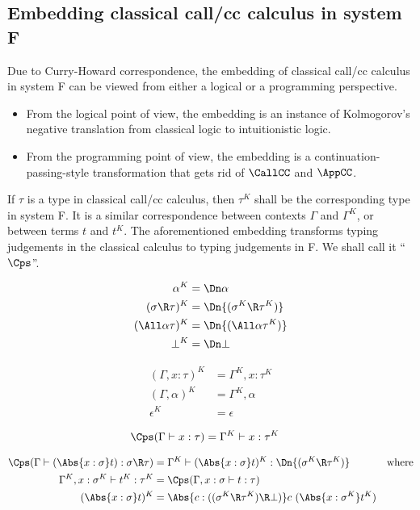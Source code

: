 \documentclass{amsart}
\begin{document}
\subsection{Embedding classical call/cc calculus in system F}

Due to Curry-Howard correspondence, the embedding of classical
call/cc calculus in system F can be viewed from either a
logical or a programming perspective.
\begin{itemize}
\item From the logical point of view, the embedding is an
instance of Kolmogorov's negative translation from classical
logic to intuitionistic logic.
\item From the programming point of view, the embedding is a
continuation-passing-style transformation that gets rid of
$\CallCC$ and $\AppCC$.
\end{itemize}
If $\tau$ is a type in classical call/cc calculus, then $\tau^K$
shall be the corresponding type in system F. It is a similar
correspondence between contexts $\Gamma$ and $\Gamma^K$, or
between terms $t$ and $t^K$. The aforementioned embedding
transforms typing judgements in the classical calculus to typing
judgements in F. We shall call it ``$\Cps$''.

\begin{align*}
\alpha^K & =
  \Dn\alpha
  \\
(\sigma \R \tau)^K & =
  \Dn{(\sigma^K \R \tau^K)}
  \\
(\All\alpha\tau)^K & =
  \Dn{(\All\alpha\tau^K)}
  \\
\bot^K & =
  \Dn\bot
\end{align*}

\begin{align*}
(\Gamma, x:\tau)^K & =
  \Gamma^K, x:\tau^K
  \\
(\Gamma, \alpha)^K & =
  \Gamma^K, \alpha
  \\
\epsilon^K & =
  \epsilon
\end{align*}

\begin{align*}
\Cps(\Gamma \vdash x : \tau) & =
  \Gamma^K \vdash x : \tau^K
\end{align*}

\begin{align*}
\Cps(\Gamma \vdash (\Abs{x:\sigma}t) : \sigma \R \tau) & =
  \Gamma^K \vdash (\Abs{x:\sigma}t)^K : \Dn{(\sigma^K \R \tau^K)} &
  \mbox{where}
  \\
\Gamma^K,x:\sigma^K \vdash t^K : \tau^K & =
  \Cps(\Gamma,x:\sigma \vdash t : \tau)
  \\
(\Abs{x:\sigma}t)^K & =
  \Abs{c : ((\sigma^K \R \tau^K) \R \bot)}c~(\Abs{x : \sigma^K} t^K)
\end{align*}
\end{document}
